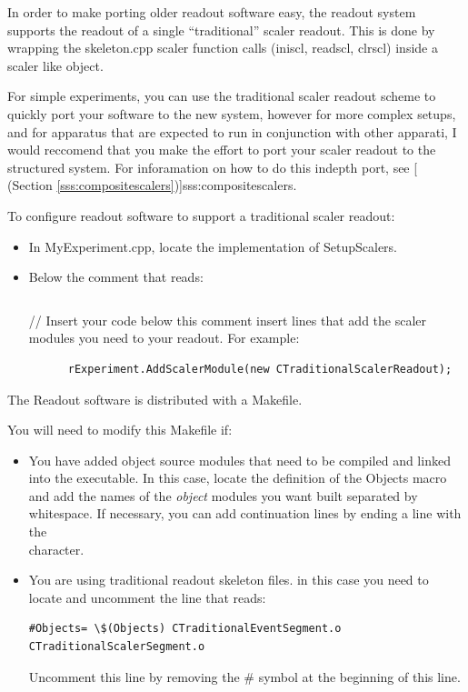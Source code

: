       In order to make porting older readout software
      easy, the readout system supports the readout of
      a single ``traditional'' scaler readout.  This is
      done by wrapping the skeleton.cpp scaler function
      calls (iniscl, readscl, clrscl) inside a scaler
      like object.
      
      For simple experiments, you can use the traditional 
      scaler readout scheme to quickly port your software to the new
      system, however for more complex setups, and for apparatus that are
      expected to run in conjunction with other apparati, I would reccomend 
      that you make the effort to port your scaler readout to the structured
      system.  For inforamation on how to do this indepth
      port, see 
      [
      (Section \ref{sss:compositescalers})]{sss:compositescalers}.
       
      To configure readout software to support a traditional
      scaler readout:
      \begin{itemize}
	 \item In MyExperiment.cpp, locate the implementation
	    of SetupScalers.
	 \item Below the comment that reads:
	   \begin{verbatim}
	      \end{verbatim}
//  Insert your code below this comment
	    insert lines that add the scaler modules you need to your readout.  For example:
	    \begin{verbatim}
      rExperiment.AddScalerModule(new CTraditionalScalerReadout);
	    \end{verbatim}
      \end{itemize}

      The Readout software is distributed with a Makefile. 

	You will need to modify this Makefile if:
	\begin{itemize}
	    \item  You have added object source modules that need to be
		   compiled and linked into the executable.  In this case,
	           locate the definition of the Objects macro and add the
                   names of the {\em object} modules you want built separated
		   by whitespace.  If necessary, you can add continuation 
	           lines by ending a line with the \\ character.
	    \item  You are using traditional readout skeleton files.  
	           in this case you need to locate and uncomment the line
		   that reads:

		\begin{verbatim}
#Objects= \$(Objects) CTraditionalEventSegment.o CTraditionalScalerSegment.o
		\end{verbatim}
		Uncomment this line by removing the \# symbol at the 
	        beginning of this line.
	\end{itemize}

